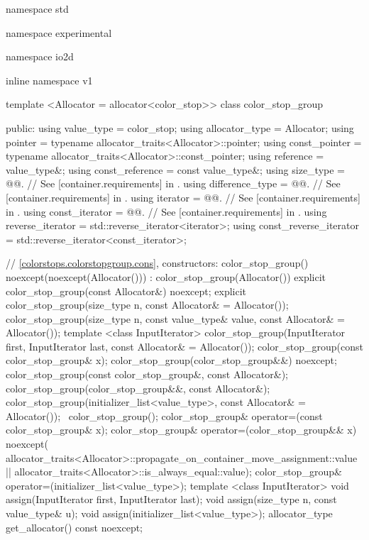 \begin{codeblock}
namespace std { namespace experimental { namespace io2d { inline namespace v1 {
  template <Allocator = allocator<color_stop>>
  class color_stop_group {
  public:
    using value_type      = color_stop;
    using allocator_type  = Allocator;
    using pointer = typename allocator_traits<Allocator>::pointer;
    using const_pointer = typename allocator_traits<Allocator>::const_pointer;
    using reference = value_type&;
    using const_reference = const value_type&;
    using size_type       = @@. // See [container.requirements] in \cppseventeen.
    using difference_type = @@. // See [container.requirements] in \cppseventeen.
    using iterator        = @@. // See [container.requirements] in \cppseventeen.
    using const_iterator  = @@. // See [container.requirements] in \cppseventeen.
    using reverse_iterator       = std::reverse_iterator<iterator>;
    using const_reverse_iterator = std::reverse_iterator<const_iterator>;

    // \ref{colorstops.colorstopgroup.cons}, constructors:    
    color_stop_group() noexcept(noexcept(Allocator())) :
    color_stop_group(Allocator()) { }
    explicit color_stop_group(const Allocator&) noexcept;
    explicit color_stop_group(size_type n, const Allocator& = Allocator());
    color_stop_group(size_type n, const value_type& value,
      const Allocator& = Allocator());
    template <class InputIterator>
    color_stop_group(InputIterator first, InputIterator last,
    const Allocator& = Allocator());
    color_stop_group(const color_stop_group& x);
    color_stop_group(color_stop_group&&) noexcept;
    color_stop_group(const color_stop_group&, const Allocator&);
    color_stop_group(color_stop_group&&, const Allocator&);
    color_stop_group(initializer_list<value_type>,
      const Allocator& = Allocator());
    ~color_stop_group();
    color_stop_group& operator=(const color_stop_group& x);
    color_stop_group& operator=(color_stop_group&& x)
      noexcept(
      allocator_traits<Allocator>::propagate_on_container_move_assignment::value
      || allocator_traits<Allocator>::is_always_equal::value);
    color_stop_group& operator=(initializer_list<value_type>);
    template <class InputIterator>
    void assign(InputIterator first, InputIterator last);
    void assign(size_type n, const value_type& u);
    void assign(initializer_list<value_type>);
    allocator_type get_allocator() const noexcept;
    
}}}}}
\end{codeblock}
